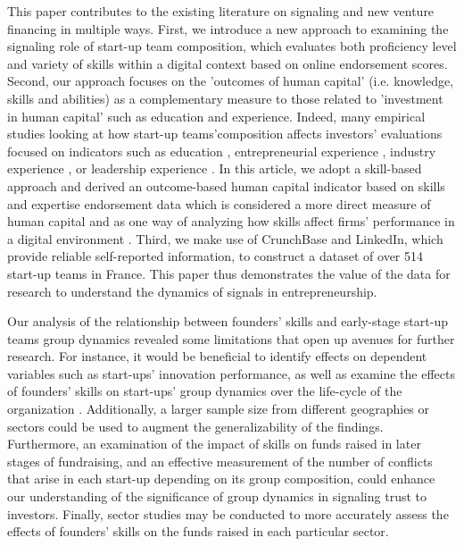 \documentclass[12pt]{article}
\begin{document}
This paper contributes to the existing literature on signaling and new venture financing in multiple ways. First, we introduce a new approach to examining the signaling role of start-up team composition, which evaluates both proficiency level and variety of skills within a digital context based on online endorsement scores. Second, our approach focuses on the 'outcomes of human capital' (i.e. knowledge, skills and abilities) as a complementary measure to those related to 'investment in human capital' such as education and experience. Indeed, many empirical studies looking at how start-up teams'composition affects investors' evaluations focused on indicators such as education \citep{franke2008venture}, entrepreneurial experience \citep{beckman2007early}, industry experience \citep{becker2015new}, or leadership experience \citep{hoenig2015quality}. In this article, we adopt a skill-based approach and derived an outcome-based human capital indicator based on skills and expertise endorsement data which is considered a more direct measure of human capital and as one way of analyzing how skills affect firms' performance in a digital environment \citep{marvel2016human}. Third, we make use of CrunchBase and LinkedIn, which provide reliable self-reported information, to construct a dataset of over 514 start-up teams in France. This paper thus demonstrates the value of the data for research to understand the dynamics of signals in entrepreneurship.

Our analysis of the relationship between founders' skills and early-stage start-up teams group dynamics revealed some limitations that open up avenues for further research. For instance, it would be beneficial to identify effects on dependent variables such as start-ups' innovation performance, as well as examine the effects of founders' skills on start-ups' group dynamics over the life-cycle of the organization \citep{knight2020start}. Additionally, a larger sample size from different geographies or sectors could be used to augment the generalizability of the findings. Furthermore, an examination of the impact of skills on funds raised in later stages of fundraising, and an effective measurement of the number of conflicts that arise in each start-up depending on its group composition, could enhance our understanding of the significance of group dynamics in signaling trust to investors. Finally, sector studies may be conducted to more accurately assess the effects of founders' skills on the funds raised in each particular sector.
\end{document}
